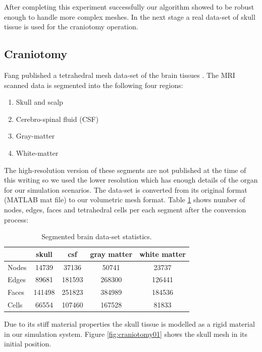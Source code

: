 After completing this experiment successfully our algorithm showed to be robust enough to handle 
more complex meshes. In the next stage a real data-set of skull tissue is used for the craniotomy operation.

\subsection{Craniotomy}
\label{sec:craniotomy}
Fang \etal published a tetrahedral mesh data-set of the brain tissues \cite{fang2010mesh}. The MRI scanned data is 
segmented into the following four regions:

\begin{enumerate}
 \item Skull and scalp
 \item Cerebro-spinal fluid (CSF)
 \item Gray-matter
 \item White-matter
\end{enumerate}

The high-resolution version of these segments are not published at the time of this writing so we used the lower resolution 
which has enough details of the organ for our simulation scenarios. The data-set is converted from its original format 
(MATLAB mat file) to our volumetric mesh format. Table \ref{table:brainmesh} shows number of nodes, edges, faces and tetrahedral cells 
per each segment after the conversion process:

\begin{table}[H]
\begin{center}
\caption{\label{table:brainmesh}{Segmented brain data-set statistics.}}
  \begin{tabular}{ | l | c | c | c | c |}
    \hline    
     & skull & csf & gray matter & white matter \\ \hline \hline    
    Nodes & 14739 & 37136 & 50741 & 23737  \\ \hline
    Edges & 89681 & 181593 & 268300 & 126441 \\ \hline
    Faces & 141498 & 251823 & 384989 & 184536 \\ \hline
    Cells & 66554 & 107460 & 167528 & 81833 \\ \hline
    \hline
  \end{tabular}
\end{center}
\end{table}

Due to its stiff material properties the skull tissue is modelled as a rigid material in our simulation system. 
Figure \ref{fig:craniotomy01} shows the skull mesh in its initial position.

